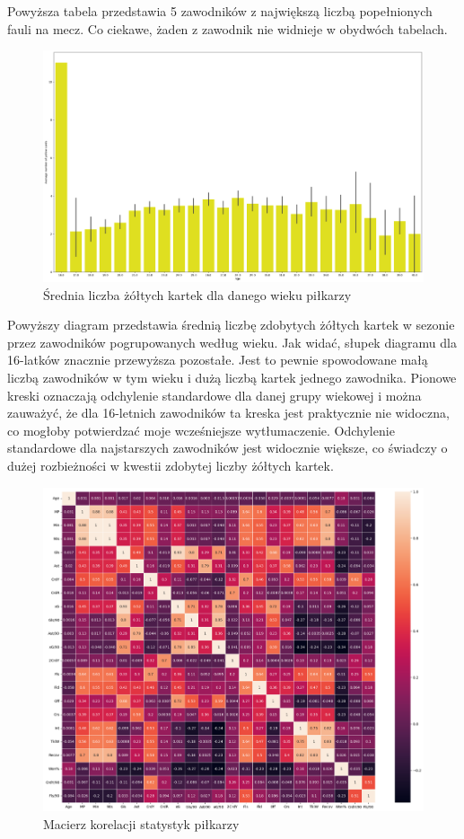 \documentclass{article}
\begin{document}
Powyższa tabela przedstawia 5 zawodników z największą liczbą popełnionych fauli na mecz. Co ciekawe, żaden z zawodnik nie widnieje w obydwóch tabelach.

\begin{figure}[H]
    \centering
    \includegraphics[scale=0.2]{yellow_cards_by_age.png}
    \caption{Średnia liczba żółtych kartek dla danego wieku piłkarzy}
    \label{img:photo3}
\end{figure}

Powyższy diagram przedstawia średnią liczbę zdobytych żółtych kartek w sezonie przez zawodników pogrupowanych według wieku. Jak widać, słupek diagramu dla 16-latków znacznie przewyższa pozostałe. Jest to pewnie spowodowane małą liczbą zawodników w tym wieku i dużą liczbą kartek jednego zawodnika. Pionowe kreski oznaczają odchylenie standardowe dla danej grupy wiekowej i można zauważyć, że dla 16-letnich zawodników ta kreska jest praktycznie nie widoczna, co mogłoby potwierdzać moje wcześniejsze wytłumaczenie. Odchylenie standardowe dla najstarszych zawodników jest widocznie większe, co świadczy o dużej rozbieżności w kwestii zdobytej liczby żółtych kartek.

\begin{figure}[H]
    \centering
    \includegraphics[scale=0.95]{correlation_matrix.png}
    \caption{Macierz korelacji statystyk piłkarzy}
    \label{img:photo4}
\end{figure}
\end{document}
